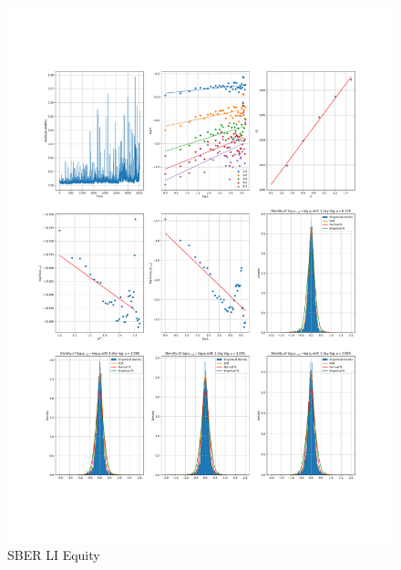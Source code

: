     \begin{figure}[h]
        \centering
        \includegraphics[width=\textwidth]{fig/SBER LI Equity.pdf}
        \caption{SBER LI Equity}
    \end{figure} 

